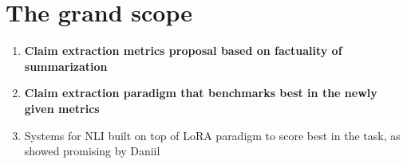 \section{The grand scope}
\begin{enumerate}
    \item \textbf{Claim extraction metrics proposal based on factuality of summarization}
    \item \textbf{Claim extraction paradigm that benchmarks best in the newly given metrics}
    \item Systems for NLI built on top of LoRA paradigm to score best in the task, as showed promising by Daniil
    
\end{enumerate}